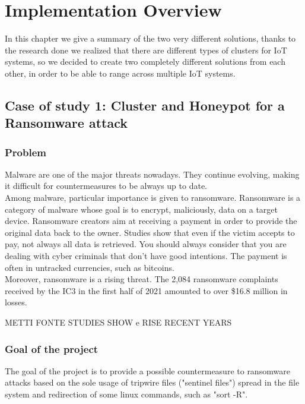 \chapter{Implementation Overview}

In this chapter we give a summary of the two very different solutions, thanks to the research done we realized that there are different types of clusters for IoT systems, so we decided to create two completely different solutions from each other, in order to be able to range across multiple IoT systems.

\section{Case of study 1: Cluster and Honeypot for a Ransomware attack}

\subsection{Problem}

Malware are one of the major threats nowadays. They continue evolving, making it difficult for countermeasures to be always up to date. \\
Among malware, particular importance is given to ransomware. Ransomware is a category of malware whose goal is to encrypt, maliciously, data on a target device. Ransomware creators aim at receiving a payment in order to provide the original data back to the owner. Studies show that even if the victim accepts to pay, not always all data is retrieved. You should always consider that you are dealing with cyber criminals that don't have good intentions. The payment is often in untracked currencies, such as bitcoins.\\
Moreover, ransomware is a rising threat. The 2,084 ransomware complaints received by the IC3 in the first half of 2021 amounted to over \$16.8 million in losses.

METTI FONTE STUDIES SHOW e RISE RECENT YEARS

\subsection{Goal of the project}

The goal of the project is to provide a possible countermeasure to ransomware attacks based on the sole usage of tripwire files ("sentinel files") spread in the file system and redirection of some linux commands, such as "sort -R".

